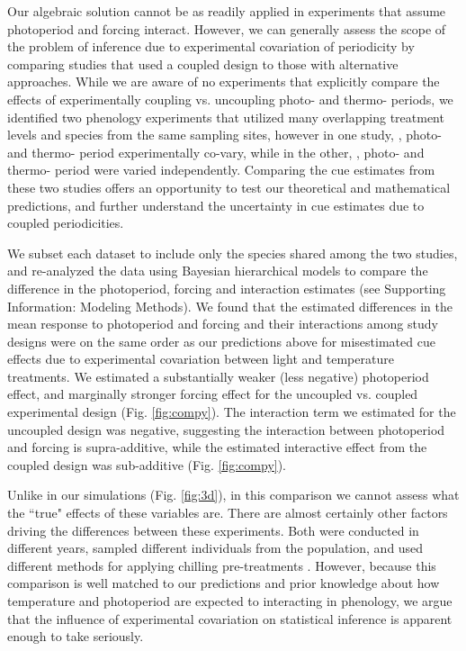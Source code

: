 \documentclass[11pt]{article}
\begin{document}
Our algebraic solution cannot be as readily applied in experiments that assume photoperiod and forcing interact. However, we can generally assess the scope of the problem of inference due to experimental covariation of periodicity by comparing studies that used a coupled design to those with alternative approaches. While we are aware of no experiments that explicitly compare the effects of experimentally coupling vs. uncoupling photo- and thermo- periods, we identified two phenology experiments that utilized many overlapping treatment levels and species from the same sampling sites, however in one study, \citet{Flynn2018}, photo- and thermo- period experimentally co-vary, while in the other, \citet{Buonaiuto:2021ug},  photo- and thermo- period were varied independently. Comparing the cue estimates from these two studies offers an opportunity to test our theoretical and mathematical predictions, and further understand the uncertainty in cue estimates due to coupled periodicities.

We subset each dataset to include only the species shared among the two studies, and re-analyzed the data using Bayesian hierarchical models to compare the difference in the photoperiod, forcing and interaction estimates (see Supporting Information: Modeling Methods). We found that the estimated differences in the mean response to photoperiod and forcing and their interactions among study designs were on the same order as our predictions above for misestimated cue effects due to experimental covariation between light and temperature treatments. We estimated a substantially weaker (less negative) photoperiod effect, and marginally stronger forcing effect for the uncoupled vs. coupled experimental design (Fig. \ref{fig:compy}). The interaction term we estimated for the uncoupled design was negative, suggesting the interaction between photoperiod and forcing is supra-additive, while the estimated interactive effect from the coupled design was sub-additive (Fig. \ref{fig:compy}).

Unlike in our simulations (Fig. \ref{fig:3d}), in this comparison we cannot assess what the ``true" effects of these variables are. There are almost certainly other factors driving the differences between these experiments. Both were conducted in different years, sampled different individuals from the population, and used different methods for applying chilling pre-treatments \citep{Flynn2018,Buonaiuto:2021ug}. However, because this comparison is well matched to our predictions and prior knowledge about how temperature and photoperiod are expected to interacting in phenology, we argue that the influence of experimental covariation on statistical inference is apparent enough to take seriously.\\
\end{document}
